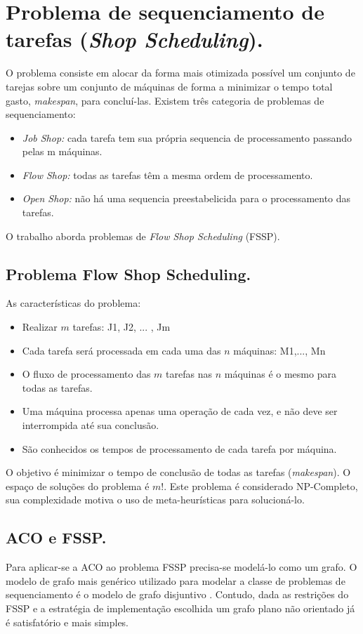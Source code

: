 \section{Problema de sequenciamento de tarefas (\textit{Shop Scheduling}).}
O problema consiste em alocar da forma mais otimizada possível um conjunto de tarejas sobre um 
conjunto de máquinas de forma a minimizar o tempo total gasto, \textit{makespan}, para concluí-las.
Existem três categoria de problemas de sequenciamento:
\begin{itemize}
\item \textit{Job Shop:} cada tarefa tem sua própria sequencia de processamento passando pelas m máquinas.
\item \textit{Flow Shop:} todas as tarefas têm a mesma ordem de processamento.
\item \textit{Open Shop:} não há uma sequencia preestabelicida para o processamento das tarefas.
\end{itemize}
O trabalho aborda problemas de \textit{Flow Shop Scheduling} (FSSP).


\subsection{Problema Flow Shop Scheduling.}
As características do problema:
\begin{itemize}
\item Realizar $m$ tarefas: J1, J2, ... , Jm
\item Cada tarefa será processada em cada uma das $n$ máquinas: M1,..., Mn
\item O fluxo de processamento das $m$ tarefas nas $n$ máquinas é o mesmo para todas as tarefas.
\item Uma máquina processa apenas uma operação de cada vez, e não deve ser interrompida até sua conclusão.
\item São conhecidos os tempos de processamento de cada tarefa por máquina.
\end{itemize}
O objetivo é minimizar o tempo de conclusão de todas as tarefas (\textit{makespan}). O espaço de soluções
do problema é $m!$. Este problema é considerado NP-Completo, sua complexidade motiva o uso de 
meta-heurísticas para solucioná-lo.


\subsection{ACO e FSSP.}

Para aplicar-se a ACO ao problema FSSP precisa-se modelá-lo como um grafo. O modelo de grafo mais genérico
utilizado para modelar a classe de problemas de sequenciamento é o modelo de grafo disjuntivo \cite{graham1994jssp}. 
Contudo, dada as restrições do FSSP e a estratégia de implementação escolhida um grafo plano não orientado 
já é satisfatório e mais simples.

